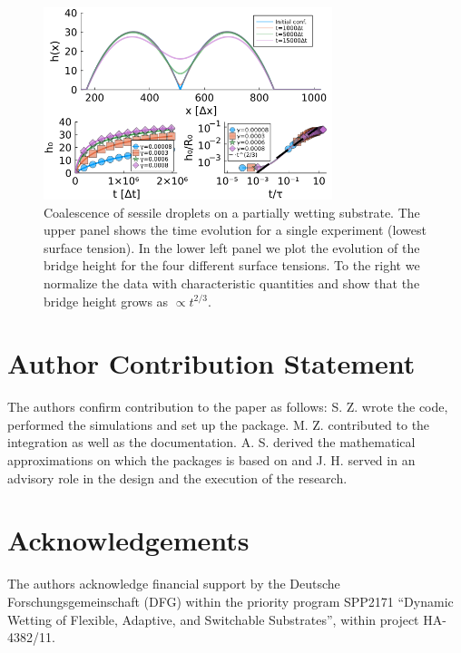 \begin{figure}
    \centering
    \includegraphics[width = 0.75\textwidth]{graphics/drop_coal.png}
    \caption{Coalescence of sessile droplets on a partially wetting substrate. The upper panel shows the time evolution for a single experiment (lowest surface tension). In the lower left panel we plot the evolution of the bridge height for the four different surface tensions. To the right we normalize the data with characteristic quantities and show that the bridge height grows as $\propto t^{2/3}$.}
    \label{fig:coalesence}
\end{figure}

\section{Author Contribution Statement}

The authors confirm contribution to the paper as follows: S. Z. wrote the code, performed the simulations and set up the package. 
M. Z. contributed to the  integration as well as the documentation. 
A. S. derived the mathematical approximations on which the packages is based on and J. H. served in an advisory role in the design and the execution of the research.

\section{Acknowledgements}

The authors acknowledge financial support by the Deutsche Forschungsgemeinschaft (DFG) within the priority program SPP2171 ``Dynamic Wetting of Flexible, Adaptive, and Switchable Substrates'', within project HA-4382/11.